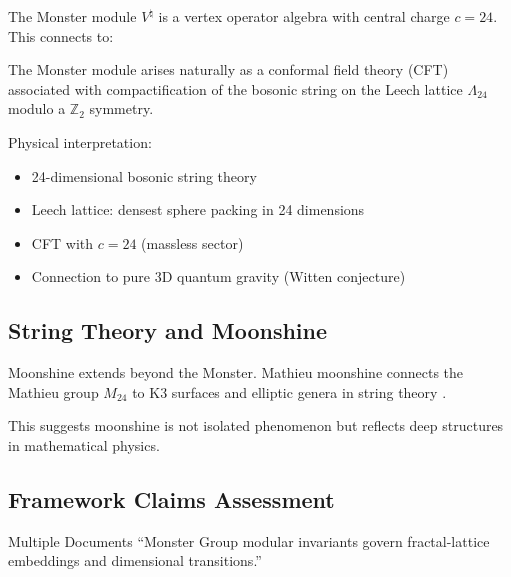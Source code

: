 The Monster module $V^{\natural}$ is a vertex operator algebra with central charge $c = 24$. This connects to:

\begin{theorem}
The Monster module arises naturally as a conformal field theory (CFT) associated with compactification of the bosonic string on the Leech lattice $\Lambda_{24}$ modulo a $\mathbb{Z}_2$ symmetry.
\end{theorem}

Physical interpretation:
\begin{itemize}
    \item 24-dimensional bosonic string theory
    \item Leech lattice: densest sphere packing in 24 dimensions
    \item CFT with $c = 24$ (massless sector)
    \item Connection to pure 3D quantum gravity (Witten conjecture)
\end{itemize}

\subsection{String Theory and Moonshine}

\begin{theorem}
Moonshine extends beyond the Monster. Mathieu moonshine connects the Mathieu group $M_{24}$ to K3 surfaces and elliptic genera in string theory \cite{duncan2015moonshine}.
\end{theorem}

This suggests moonshine is not isolated phenomenon but reflects deep structures in mathematical physics.

\subsection{Framework Claims Assessment}

\begin{frameworkclaim}{Multiple Documents}
``Monster Group modular invariants govern fractal-lattice embeddings and dimensional transitions.''
\end{frameworkclaim}

